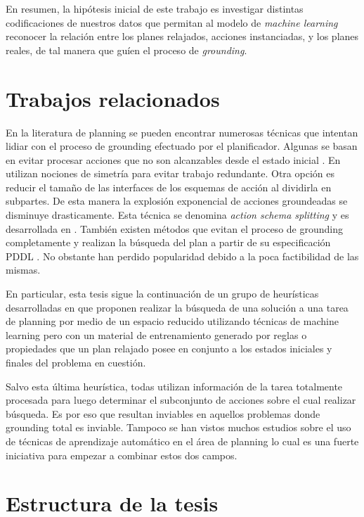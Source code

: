En resumen, la hipótesis inicial de este trabajo es investigar distintas
codificaciones de nuestros datos que permitan al modelo de \emph{machine
learning} reconocer la relación entre los planes relajados, acciones
instanciadas, y los planes reales, de tal manera que guíen el proceso de
\emph{grounding}.

\section{Trabajos relacionados}

En la literatura de planning se pueden encontrar numerosas técnicas que intentan
lidiar con el proceso de grounding efectuado por el planificador. Algunas se
basan en evitar procesar acciones que no son alcanzables desde el estado inicial
\citep{}. En \citep{} utilizan nociones de simetría para evitar trabajo
redundante. Otra opción es reducir el tamaño de las interfaces de los esquemas
de acción al dividirla en subpartes. De esta manera la explosión exponencial de
acciones groundeadas se disminuye drasticamente. Esta técnica se denomina
\emph{action schema splitting} y es desarrollada en \citep{}. También existen
métodos que evitan el proceso de grounding completamente y realizan la búsqueda
del plan a partir de su especificación PDDL \citep{}. No obstante han perdido
popularidad debido a la poca factibilidad de las mismas.

En particular, esta tesis sigue la continuación de un grupo de heurísticas
desarrolladas en \citep{Gnad_Torralba_Dominguez_Areces_Bustos_2019} que proponen
realizar la búsqueda de una solución a una tarea de planning por medio de un
espacio reducido utilizando técnicas de machine learning pero con un material de
entrenamiento generado por reglas o propiedades que un plan relajado posee en
conjunto a los estados iniciales y finales del problema en cuestión.

Salvo esta última heurística, todas utilizan información de la tarea totalmente
procesada para luego determinar el subconjunto de acciones sobre el cual
realizar búsqueda. Es por eso que resultan inviables en aquellos problemas donde
grounding total es inviable. Tampoco se han vistos muchos estudios sobre el uso
de técnicas de aprendizaje automático en el área de planning lo cual es una
fuerte iniciativa para empezar a combinar estos dos campos.

\section{Estructura de la tesis}

